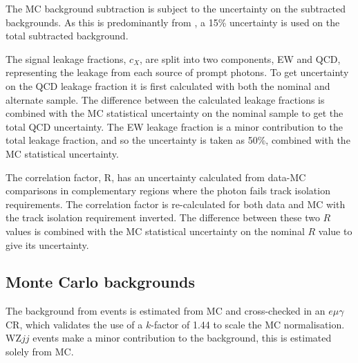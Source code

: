The \ac{MC} background subtraction is subject to the uncertainty on the
subtracted backgrounds. As this is predominantly from \tty, a 15\% uncertainty
is used on the total subtracted background.

The signal leakage fractions, $c_X$, are split into two components, \ac{EW} and
\ac{QCD}, representing the leakage from each source of prompt photons.  To get
uncertainty on the \ac{QCD} leakage fraction it is first calculated with both
the nominal and alternate sample. The difference between the calculated leakage
fractions is combined with the \ac{MC} statistical uncertainty on the nominal
sample to get the total \ac{QCD} uncertainty. The \ac{EW} leakage fraction is a
minor contribution to the total leakage fraction, and so the uncertainty is
taken as 50\%, combined with the \ac{MC} statistical uncertainty.

The correlation factor, R, has an uncertainty calculated from data-\ac{MC}
comparisons in complementary regions where the photon fails track isolation
requirements. The correlation factor is re-calculated for both data and \ac{MC}
with the track isolation requirement inverted. The difference between these two
$R$ values is combined with the \ac{MC} statistical uncertainty on the nominal
$R$ value to give its uncertainty.

\subsection{Monte Carlo backgrounds}

The background from \tty events is estimated from \ac{MC} and cross-checked in
an $e\mu\gamma$ \ac{CR}, which validates the use of a $k$-factor of 1.44 to
scale the \ac{MC} normalisation. WZ$jj$ events make a minor contribution to the
background, this is estimated solely from \ac{MC}.
